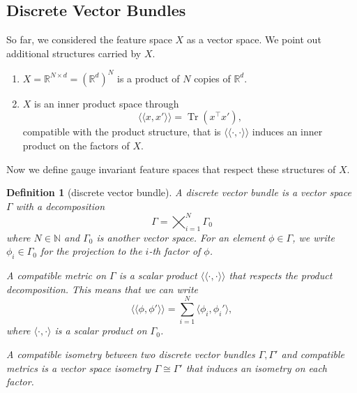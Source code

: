 \documentclass[10pt,reqno]{amsart}
\numberwithin{equation}{section}
\theoremstyle{bfnote}
\theoremstyle{bfdef}
\newtheorem{definition}[theorem]{Definition}
\newcommand{\lla}{\langle\langle}
\newcommand{\rra}{\rangle\rangle}
\newcommand{\R}{\mathbb{R}}
\renewcommand\o\operatorname
\providecommand\X; %
\renewcommand{\X}{X}
\begin{document}
\subsection{Discrete Vector Bundles}
	So far, we considered the feature space $\X$ as a vector space. We point out additional structures carried by $\X$.
	\begin{enumerate}
		\item $\X = \R^{N \times d} = (\R^d)^N$ is a product of $N$ copies of $\R^d$.

		\item $\X$ is an inner product space through
			\begin{equation}
				\lla x,x' \rra = \o{Tr}(x^{\top}x'),
			\end{equation}
			compatible with the product structure, that is $\lla \cdot,\cdot \rra$ induces an inner product on the factors of $\X$.
	\end{enumerate}
	Now we define gauge invariant feature spaces that respect these structures of $\X$.

	\begin{definition}[discrete vector bundle]\label{def:product-metric-structures}
		A \textit{discrete vector bundle} is a vector space $\Gamma$ with a decomposition
		\begin{equation}
			\Gamma = \bigtimes_{i=1}^N \Gamma_0
		\end{equation}
		where $N \in \mathbb{N}$ and $\Gamma_0$ is another vector space. For an element $\phi \in \Gamma$, we write $\phi_i \in \Gamma_0$ for the projection to the $i$-th factor of $\phi$. 

		A \textit{compatible metric} on $\Gamma$ is a scalar product $\langle \langle \cdot, \cdot \rangle\rangle$ that respects the product decomposition. This means that we can write
		\begin{equation}
			\langle \langle \phi,\phi' \rangle \rangle
			= \sum_{i=1}^N \langle \phi_i , \phi_i' \rangle,
		\end{equation}
		where $\langle \cdot , \cdot \rangle$ is a scalar product on $\Gamma_{0}$.

		A \textit{compatible isometry} between two discrete vector bundles $\Gamma,\Gamma'$ and compatible metrics is a vector space isometry $\Gamma \cong \Gamma'$ that induces an isometry on each factor.
	\end{definition}
	
\end{document}

